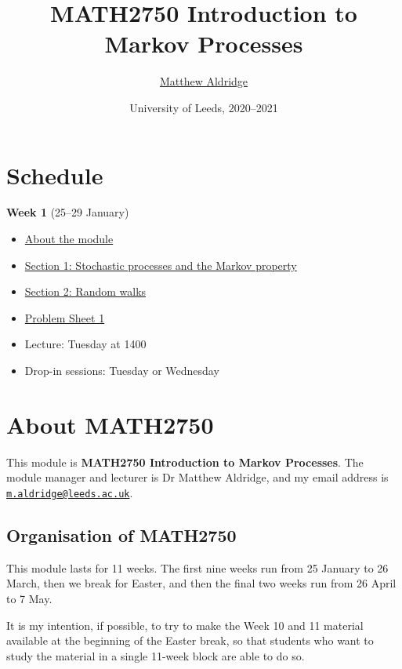 \documentclass[
  a4paper,
]{article}
\title{MATH2750 Introduction to Markov Processes}
\author{\href{mailto:m.aldridge@leeds.ac.uk}{Matthew Aldridge}}
\date{University of Leeds, 2020--2021}
\providecommand{\tightlist}{%
  \setlength{\itemsep}{0pt}\setlength{\parskip}{0pt}}
\theoremstyle{definition}
\theoremstyle{definition}
\theoremstyle{definition}
\theoremstyle{remark}
\begin{document}
\maketitle

{
\setcounter{tocdepth}{2}
\tableofcontents
}
\hypertarget{home}{%
\section*{Schedule}\label{home}}

\textbf{Week 1} (25--29 January)

\begin{itemize}
\tightlist
\item
  \protect\hyperlink{S00-about}{About the module}
\item
  \protect\hyperlink{S01-stochastic-processes}{Section 1: Stochastic processes and the Markov property}
\item
  \protect\hyperlink{S02-random-walks}{Section 2: Random walks}
\item
  \protect\hyperlink{P01}{Problem Sheet 1}
\item
  Lecture: Tuesday at 1400
\item
  Drop-in sessions: Tuesday or Wednesday
\end{itemize}

\hypertarget{S00-about}{%
\section*{About MATH2750}\label{S00-about}}

This module is \textbf{MATH2750 Introduction to Markov Processes}. The module manager and lecturer is Dr Matthew Aldridge, and my email address is \href{mailto:m.aldridge@leeds.ac.uk}{\nolinkurl{m.aldridge@leeds.ac.uk}}.

\hypertarget{about-module}{%
\subsection*{Organisation of MATH2750}\label{about-module}}

This module lasts for 11 weeks. The first nine weeks run from 25 January to 26 March, then we break for Easter, and then the final two weeks run from 26 April to 7 May.

It is my intention, if possible, to try to make the Week 10 and 11 material available at the beginning of the Easter break, so that students who want to study the material in a single 11-week block are able to do so.
\end{document}
